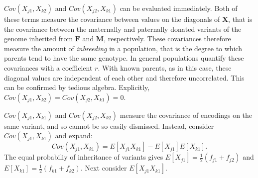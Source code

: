 \documentclass[sts]{imsart}
\newcommand{\m}[1]{\mathbf{#1}}               %
\begin{document}
$Cov(X_{j1}, X_{k2})$ and $Cov(X_{j2}, X_{k1})$ can be evaluated immediately. Both of these terms measure the covariance between values on the diagonals of $\m{X}$, that is the covariance between the maternally and paternally donated variants of the genome inherited from $\m{F}$ and $\m{M}$, respectively. These covariances therefore measure the amount of \emph{inbreeding} in a population, that is the degree to which parents tend to have the same genotype. In general populations \cite{crowkimura1970intro} quantify these covariances with a coefficient $r$. With known parents, as in this case, these diagonal values are independent of each other and therefore uncorrelated. This can be confirmed by tedious algebra. Explicitly, $Cov(X_{j1}, X_{k2}) = Cov(X_{j2}, X_{k1}) = 0$. 

$Cov(X_{j1}, X_{k1})$ and $Cov(X_{j2}, X_{k2})$ measure the covariance of encodings on the same variant, and so cannot be so easily dismissed. Instead, consider $Cov(X_{j1}, X_{k1})$ and expand:
$$Cov(X_{j1}, X_{k1}) = E[X_{j1} X_{k1}] - E[X_{j1}]E[X_{k1}].$$
The equal probabiliy of inheritance of variants gives $E[X_{j1}] = \frac{1}{2}(f_{j1} + f_{j2})$ and $E[X_{k1}] = \frac{1}{2}(f_{k1} + f_{k2})$. Next consider $E[X_{j1} X_{k1}]$.
\end{document}
